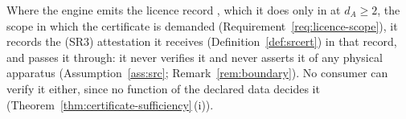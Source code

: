 
\begin{requirement}\label{req:attestation-record}
Where the engine emits the licence record ,
which it does only in  at $d_A\ge2$, the scope in
which the certificate is demanded (Requirement~\ref{req:licence-scope}), it
records the (SR3) attestation it receives (Definition~\ref{def:srcert}) in that
record, and passes it through: it never
verifies it and never asserts it of any physical apparatus
(Assumption~\ref{ass:src}; Remark~\ref{rem:boundary}). No consumer can
verify it either, since no function of the declared data decides it
(Theorem~\ref{thm:certificate-sufficiency}\,(i)).
\end{requirement}
